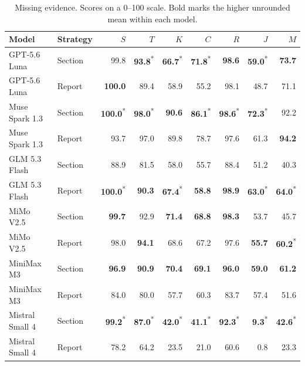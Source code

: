 \begin{table}[t]
\centering\small
\setlength{\tabcolsep}{4pt}
\caption{Missing evidence. Scores on a 0--100 scale. Bold marks the higher unrounded mean within each model.}
\label{tab:rq1b}
\begin{tabular}{llrrrrrrr}
\toprule
Model & Strategy & $S$ & $T$ & $K$ & $C$ & $R$ & $J$ & $M$ \\
\midrule
GPT-5.6 Luna & Section & 99.8 & \textbf{93.8}\textsuperscript{*} & \textbf{66.7}\textsuperscript{*} & \textbf{71.8}\textsuperscript{*} & \textbf{98.6} & \textbf{59.0}\textsuperscript{*} & \textbf{73.7} \\
GPT-5.6 Luna & Report & \textbf{100.0} & 89.4 & 58.9 & 55.2 & 98.1 & 48.7 & 71.1 \\
\addlinespace[2pt]
Muse Spark 1.3 & Section & \textbf{100.0}\textsuperscript{*} & \textbf{98.0}\textsuperscript{*} & \textbf{90.6} & \textbf{86.1}\textsuperscript{*} & \textbf{98.6}\textsuperscript{*} & \textbf{72.3}\textsuperscript{*} & 92.2 \\
Muse Spark 1.3 & Report & 93.7 & 97.0 & 89.8 & 78.7 & 97.6 & 61.3 & \textbf{94.2} \\
\addlinespace[2pt]
GLM 5.3 Flash & Section & 88.9 & 81.5 & 58.0 & 55.7 & 88.4 & 51.2 & 40.3 \\
GLM 5.3 Flash & Report & \textbf{100.0}\textsuperscript{*} & \textbf{90.3} & \textbf{67.4}\textsuperscript{*} & \textbf{58.8} & \textbf{98.9} & \textbf{63.0}\textsuperscript{*} & \textbf{64.0}\textsuperscript{*} \\
\addlinespace[2pt]
MiMo V2.5 & Section & \textbf{99.7} & 92.9 & \textbf{71.4} & \textbf{68.8} & \textbf{98.3} & 53.7 & 45.7 \\
MiMo V2.5 & Report & 98.0 & \textbf{94.1} & 68.6 & 67.2 & 97.6 & \textbf{55.7} & \textbf{60.2}\textsuperscript{*} \\
\addlinespace[2pt]
MiniMax M3 & Section & \textbf{96.9} & \textbf{90.9} & \textbf{70.4} & \textbf{69.1} & \textbf{96.0} & \textbf{59.0} & \textbf{61.2} \\
MiniMax M3 & Report & 84.0 & 80.0 & 57.7 & 60.3 & 83.7 & 57.4 & 51.6 \\
\addlinespace[2pt]
Mistral Small 4 & Section & \textbf{99.2}\textsuperscript{*} & \textbf{87.0}\textsuperscript{*} & \textbf{42.0}\textsuperscript{*} & \textbf{41.1}\textsuperscript{*} & \textbf{92.3}\textsuperscript{*} & \textbf{9.3}\textsuperscript{*} & \textbf{42.6}\textsuperscript{*} \\
Mistral Small 4 & Report & 78.2 & 64.2 & 23.5 & 21.0 & 60.6 & 0.8 & 23.3 \\

\end{tabular}
\end{table}
